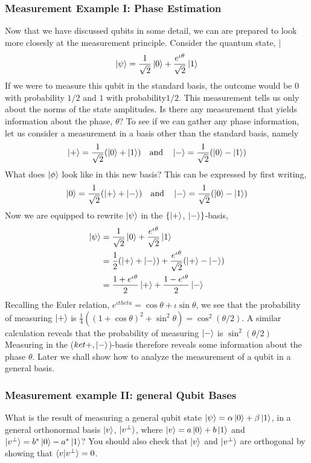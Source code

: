 \subsubsection{Measurement Example I: Phase Estimation}
Now that we have discussed qubits in some detail, we can are prepared to
look more closesly at the measurement principle. Consider the quantum
state,
|\[
\ket{\psi}=\frac{1}{\sqrt{2}}\ket{0}+\frac{e^{\iota\theta}}{\sqrt{2}}\ket{1}
\]
If we were to measure this qubit in the standard basis, the outcome would
be $0$ with probability $1/2$ and $1$ with probability$ 1/2$. This measurement
tells us only about the norms of the state amplitudes. Is there any measurement that yields information about the phase, $\theta$?
To see if we can gather any phase information, let us consider a measurement in a basis other than the standard basis, namely
\[
\ket{+}=\frac{1}{\sqrt{2}}(\ket{0}+\ket{1}) \quad \text{and}\quad \ket{-}=\frac{1}{\sqrt{2}}(\ket{0}-\ket{1})
\]
What does $\ket{\phi}$ look like in this new basis? This can be expressed by first
writing,
\[
\ket{0}=\frac{1}{\sqrt{2}}(\ket{+}+\ket{-}) \quad \text{and} \quad \ket{-}=\frac{1}{\sqrt{2}}(\ket{0}-\ket{1})
\]
Now we are equipped to rewrite $\ket{\psi}$ in the $\{\ket{+}$, $\ket{-}\}$-basis,
\begin{align*}
\ket{\psi}&=\frac{1}{\sqrt{2}}\ket{0}+\frac{e^{\iota\theta}}{\sqrt{2}}\ket{1}\\
&=\frac{1}{2}(\ket{+}+\ket{-})+\frac{e^{\iota\theta}}{\sqrt{2}}(\ket{+}-\ket{-})\\
&=\frac{1+e^{\iota\theta}}{2}\ket{+}+\frac{1-e^{\iota\theta}}{2}\ket{-}
\end{align*}
Recalling the Euler relation, $e^{\iota theta}=\cos \theta+\iota\sin \theta$, we see that the probability
of measuring $\ket{+}$ is $\frac{1}{4}((1+\cos \theta)^2+\sin^2 \theta)=\cos^2 (\theta/2)$. A similar calculation reveals that the probability of measuring $\ket{-}$ is $\sin^2 (\theta/2)$ Measuring
in the ($ket{+},\ket{-}$)-basis therefore reveals some information about the phase $\theta$.
Later we shall show how to analyze the measurement of a qubit in a
general basis.

\subsubsection{Measurement example II: general Qubit Bases}
What is the result of measuring a general qubit state $\ket{\psi}=\alpha\ket{0}+\beta\ket{1}$, in
a general orthonormal basis $\ket{v}$, $\ket{v^{\perp}}$, where $\ket{v}=a\ket{0}+b\ket{1}$ and $\ket{v^{\perp}}=b^*\ket{0}-a^*\ket{1}$? You should also check that $\ket{v}$ and $\ket{v^{\perp}}$ are orthogonal by
showing that $\braket{v|v^{\perp}}=0$.

